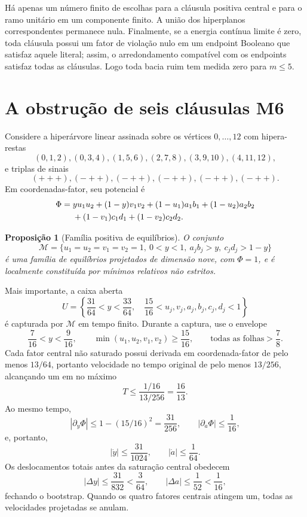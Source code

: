\documentclass[11pt,a4paper]{article}
\newtheorem{proposition}[theorem]{Proposição}
\begin{document}
Há apenas um número finito de escolhas para a cláusula positiva central e para o ramo unitário em um componente finito. A união dos hiperplanos correspondentes permanece nula. Finalmente, se a energia contínua limite é zero, toda cláusula possui um fator de violação nulo em um endpoint Booleano que satisfaz aquele literal; assim, o arredondamento compatível com os endpoints satisfaz todas as cláusulas. Logo toda bacia ruim tem medida zero para $m\le5$.

\section{A obstrução de seis cláusulas M6}\label{sec:m6}
Considere a hiperárvore linear assinada sobre os vértices $0,\ldots,12$ com hipera-restas
\[
(0,1,2),(0,3,4),(1,5,6),(2,7,8),(3,9,10),(4,11,12),
\]
e triplas de sinais
\[
(+++) ,(-++),(-++),(-++),(-++),(-++).
\]
Em coordenadas-fator, seu potencial é
\begin{align}
\Phi={}&yu_1u_2+(1-y)v_1v_2+(1-u_1)a_1b_1+(1-u_2)a_2b_2\notag\\
&+(1-v_1)c_1d_1+(1-v_2)c_2d_2.
\end{align}

\begin{proposition}[Família positiva de equilíbrios]
O conjunto
\[
\mathcal M=\{u_1=u_2=v_1=v_2=1,\ 0<y<1,\ a_jb_j>y,\ c_jd_j>1-y\}
\]
é uma família de equilíbrios projetados de dimensão nove, com $\Phi=1$, e é localmente constituída por mínimos relativos não estritos.
\end{proposition}

Mais importante, a caixa aberta
\begin{equation}
U=\left\{\frac{31}{64}<y<\frac{33}{64},\quad
\frac{15}{16}<u_j,v_j,a_j,b_j,c_j,d_j<1\right\}
\end{equation}
é capturada por $\mathcal M$ em tempo finito. Durante a captura, use o envelope
\[
\frac{7}{16}<y<\frac{9}{16},\qquad
\min(u_1,u_2,v_1,v_2)\ge\frac{15}{16},\qquad
\text{todas as folhas}>\frac78.
\]
Cada fator central não saturado possui derivada em coordenada-fator de pelo menos $13/64$, portanto velocidade no tempo original de pelo menos $13/256$, alcançando um em no máximo
\[
T\le\frac{1/16}{13/256}=\frac{16}{13}.
\]
Ao mesmo tempo,
\[
|\partial_y\Phi|\le1-(15/16)^2=\frac{31}{256},\qquad
|\partial_a\Phi|\le\frac1{16},
\]
e, portanto,
\[
|\dot y|\le\frac{31}{1024},\qquad |\dot a|\le\frac1{64}.
\]
Os deslocamentos totais antes da saturação central obedecem
\[
|\Delta y|\le\frac{31}{832}<\frac3{64},\qquad
|\Delta a|\le\frac1{52}<\frac1{16},
\]
fechando o bootstrap. Quando os quatro fatores centrais atingem um, todas as velocidades projetadas se anulam.
\end{document}
